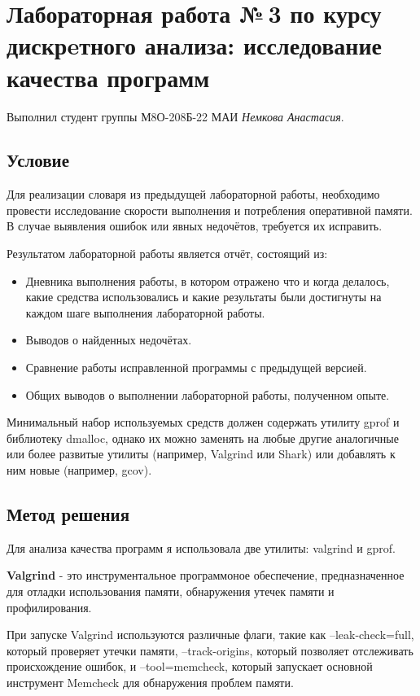 \documentclass[12pt]{article}
\begin{document}
\section*{Лабораторная работа №\,3 по курсу дискрeтного анализа: исследование качества программ}

Выполнил студент группы М8О-208Б-22 МАИ \textit{Немкова Анастасия}.

\subsection*{Условие}
Для реализации словаря из предыдущей лабораторной работы, необходимо провести исследование скорости выполнения и потребления оперативной памяти. В случае выявления ошибок или явных недочётов, требуется их исправить.

Результатом лабораторной работы является отчёт, состоящий из:

\begin{itemize}
    \item Дневника выполнения работы, в котором отражено что и когда делалось, какие средства использовались и какие результаты были достигнуты на каждом шаге выполнения лабораторной работы.
    \item Выводов о найденных недочётах.
    \item Сравнение работы исправленной программы с предыдущей версией.
    \item Общих выводов о выполнении лабораторной работы, полученном опыте.
\end{itemize}

Минимальный набор используемых средств должен содержать утилиту gprof и библиотеку dmalloc, однако их можно заменять на любые другие аналогичные или более развитые утилиты (например, Valgrind или Shark) или добавлять к ним новые (например, gcov).


\subsection*{Метод решения}

Для анализа качества программ я использовала две утилиты: valgrind и gprof.

\textbf{Valgrind} - это инструментальное программоное обеспечение, предназначенное для отладки использования памяти, обнаружения утечек памяти и профилирования. 

При запуске Valgrind используются различные флаги, такие как --leak-check=full, который проверяет утечки памяти, --track-origins, который позволяет отслеживать происхождение ошибок, и --tool=memcheck, который запускает основной инструмент Memcheck для обнаружения проблем памяти.
\end{document}
